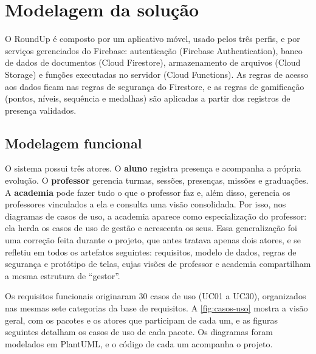 
\chapter{Modelagem da solução}
\label{cap:modelagem}

O RoundUp é composto por um aplicativo móvel, usado pelos três perfis, e
por serviços gerenciados do Firebase: autenticação (Firebase
Authentication), banco de dados de documentos (Cloud Firestore),
armazenamento de arquivos (Cloud Storage) e funções executadas no servidor
(Cloud Functions). As regras de acesso aos dados ficam nas regras de
segurança do Firestore, e as regras de gamificação (pontos, níveis,
sequência e medalhas) são aplicadas a partir dos registros de presença
validados.

\section{Modelagem funcional}
\label{sec:modelagem-funcional}

O sistema possui três atores. O \textbf{aluno} registra presença e
acompanha a própria evolução. O \textbf{professor} gerencia turmas,
sessões, presenças, missões e graduações. A \textbf{academia} pode fazer
tudo o que o professor faz e, além disso, gerencia os professores
vinculados a ela e consulta uma visão consolidada. Por isso, nos
diagramas de casos de uso, a academia aparece como especialização do
professor: ela herda os casos de uso de gestão e acrescenta os seus. Essa
generalização foi uma correção feita durante o projeto, que antes tratava
apenas dois atores, e se refletiu em todos os artefatos seguintes:
requisitos, modelo de dados, regras de segurança e protótipo de telas,
cujas visões de professor e academia compartilham a mesma estrutura de
``gestor''.

Os requisitos funcionais originaram 30 casos de uso (UC01 a UC30),
organizados nas mesmas sete categorias da base de requisitos. A
\autoref{fig:casos-uso} mostra a visão geral, com os pacotes e os atores
que participam de cada um, e as figuras seguintes detalham os casos de
uso de cada pacote. Os diagramas foram modelados em PlantUML, e o código
de cada um acompanha o projeto.

